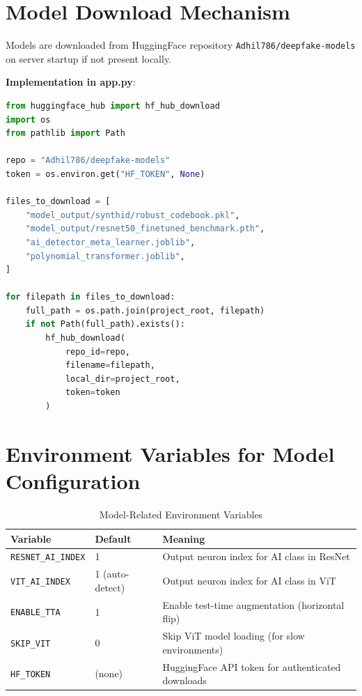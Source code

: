 \documentclass[12pt,a4paper]{book}
\begin{document}
\begin{itemize}
\section{Model Download Mechanism}

Models are downloaded from HuggingFace repository \texttt{Adhil786/deepfake-models} on server startup if not present locally.

\textbf{Implementation in app.py}:

\begin{lstlisting}[language=Python]
from huggingface_hub import hf_hub_download
import os
from pathlib import Path

repo = "Adhil786/deepfake-models"
token = os.environ.get("HF_TOKEN", None)

files_to_download = [
    "model_output/synthid/robust_codebook.pkl",
    "model_output/resnet50_finetuned_benchmark.pth",
    "ai_detector_meta_learner.joblib",
    "polynomial_transformer.joblib",
]

for filepath in files_to_download:
    full_path = os.path.join(project_root, filepath)
    if not Path(full_path).exists():
        hf_hub_download(
            repo_id=repo,
            filename=filepath,
            local_dir=project_root,
            token=token
        )
\end{lstlisting}

\section{Environment Variables for Model Configuration}

\begin{table}[H]
\centering
\captionsetup{justification=centering}
\caption{Model-Related Environment Variables}
\begin{tabular}{|l|l|p{5cm}|}
\hline
\textbf{Variable} & \textbf{Default} & \textbf{Meaning} \\
\hline
\texttt{RESNET\_AI\_INDEX} & 1 & Output neuron index for AI class in ResNet \\
\hline
\texttt{VIT\_AI\_INDEX} & 1 (auto-detect) & Output neuron index for AI class in ViT \\
\hline
\texttt{ENABLE\_TTA} & 1 & Enable test-time augmentation (horizontal flip) \\
\hline
\texttt{SKIP\_VIT} & 0 & Skip ViT model loading (for slow environments) \\
\hline
\texttt{HF\_TOKEN} & (none) & HuggingFace API token for authenticated downloads \\
\hline
\end{tabular}
\end{table}


\end{itemize}
\end{document}
